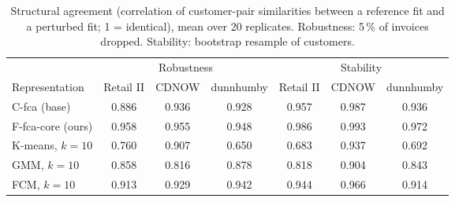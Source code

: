 \begin{table}[t]
\centering\footnotesize
\caption{Structural agreement (correlation of customer-pair similarities between a reference fit and a perturbed fit; 1 = identical), mean over 20 replicates. Robustness: 5\,\% of invoices dropped. Stability: bootstrap resample of customers.}
\label{tab:structure}
\begin{tabular}{lcccccc}
\toprule
 & \multicolumn{3}{c}{Robustness} & \multicolumn{3}{c}{Stability} \\
\cmidrule(lr){2-4}\cmidrule(lr){5-7}
Representation & Retail II & CDNOW & dunnhumby & Retail II & CDNOW & dunnhumby \\
\midrule
C-fca (base) & 0.886 & 0.936 & 0.928 & 0.957 & 0.987 & 0.936 \\
F-fca-core (ours) & 0.958 & 0.955 & 0.948 & 0.986 & 0.993 & 0.972 \\
K-means, $k{=}10$ & 0.760 & 0.907 & 0.650 & 0.683 & 0.937 & 0.692 \\
GMM, $k{=}10$ & 0.858 & 0.816 & 0.878 & 0.818 & 0.904 & 0.843 \\
FCM, $k{=}10$ & 0.913 & 0.929 & 0.942 & 0.944 & 0.966 & 0.914 \\
\bottomrule
\end{tabular}
\end{table}
